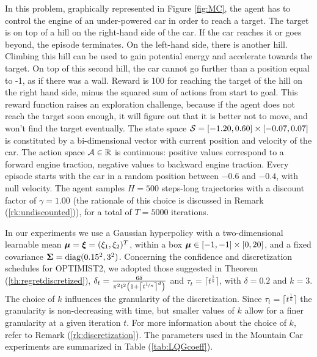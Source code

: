 In this problem, graphically represented in Figure \ref{fig:MC}, the agent has to control the engine of an under-powered car in order to reach a target. The target is on top of a hill on the right-hand side of the car. If the car reaches it or goes beyond, the episode terminates. On the left-hand side, there is another hill. Climbing this hill can be used to gain potential energy and accelerate towards the target. On top of this second hill, the car cannot go further than a position equal to -1, as if there was a wall. Reward is 100 for reaching the target of the hill on the right hand side, minus the squared sum of actions from start to goal. This reward function raises an exploration challenge, because if the agent does not reach the target soon enough, it will figure out that it is better not to move, and won't find the target eventually. The state space $\mathcal{S}=[-1.20,0.60]\times[-0.07,0.07]$ is constituted by a bi-dimensional vector with current position and velocity of the car. The action space $\mathcal{A}\in\mathbb{R}$ is continuous: positive values correspond to a forward engine traction, negative values to backward engine traction. Every episode starts with the car in a random position between $-0.6$ and $-0.4$, with null velocity. The agent samples $H=500$ steps-long trajectories with a discount factor of $\gamma=1.00$ (the rationale of this choice is discussed in Remark (\ref{rk:undiscounted})), for a total of $T=5000$ iterations. 

In our experiments we use a Gaussian hyperpolicy with a two-dimensional learnable mean $\boldsymbol{\mu}=\boldsymbol{\xi}=(\xi_1, \xi_2)^T$, within a box $\boldsymbol{\mu}\in[-1,-1]\times[0,20]$, and a fixed covariance $\boldsymbol{\Sigma}=\mathrm{diag}(0.15^2,3^2)$. Concerning the confidence and discretization schedules for \gls{OPTIMIST}2, we adopted those suggested in Theorem (\ref{th:regretdiscretized}), \ie ${\delta_t = \frac{6\delta}{\pi^2t^2\left(1+\left\lceil t^{\nicefrac{1}{\kappa}}\right\rceil^d\right)}}$ and $\tau_t=\lceil t^{\frac{1}{\kappa}} \rceil$, with $\delta=0.2$ and $k=3$. The choice of $k$ influences the granularity of the discretization. Since $\tau_t=\lceil t^{\frac{1}{\kappa}} \rceil$ the granularity is non-decreasing with time, but smaller values of $k$ allow for a finer granularity at a given iteration $t$. For more information about the choice of $k$, refer to Remark (\ref{rk:discretization}). The parameters used in the Mountain Car experiments are summarized in Table (\ref{tab:LQGcoeff}).

